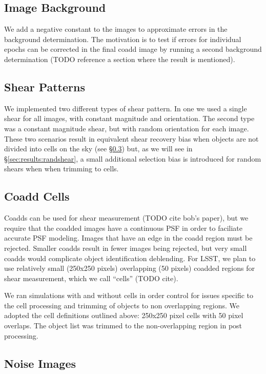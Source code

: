 \documentclass[iop, twocolappendix, appendixfloats, numberedappendix, apj]{hackemulateapj}
\begin{document}
\subsection{Image Background} \label{sec:sim:bgerr}

We add a negative constant to the images to approximate errors in the
background determination.  The motivation is to test if errors for individual
epochs can be corrected in the final coadd image by running a second background
determination (TODO reference a section where the result is mentioned).

\subsection{Shear Patterns} \label{sec:sim:shears}

We implemented two different types of shear pattern.  In one we used a single
shear for all images, with constant magnitude and orientation.  The second type
was a constant magnitude shear, but with random orientation for each image.
These two scenarios result in equivalent shear recovery bias when objects are
not divided into cells on the sky (see \S \ref{sec:sim:cells}) but, as we will
see in \S \ref{sec:results:randshear}, a small additional selection bias is
introduced for random shears when when trimming to cells.

\subsection{Coadd Cells} \label{sec:sim:cells}

Coadds can be used for shear measurement (TODO cite bob's paper), but we
require that the coadded images have a continuous PSF in order to faciliate
accurate PSF modeling.  Images that have an edge in the coadd region must be
rejected.  Smaller coadds result in fewer images being rejected, but very small
coadds would complicate object identification deblending.  For LSST, we plan to
use relatively small (250x250 pixels) overlapping (50 pixels) coadded regions
for shear measurement, which we call ``cells'' (TODO cite).

We ran simulations with and without cells in order control for issues specific
to the cell processing and trimming of objects to non overlapping regions.  We
adopted the cell definitions outlined above: 250x250 pixel cells with 50 pixel
overlaps. The object list was trimmed to the non-overlapping region in post
processing.

\subsection{Noise Images} \label{sec:sim:noiseimages}
\end{document}
